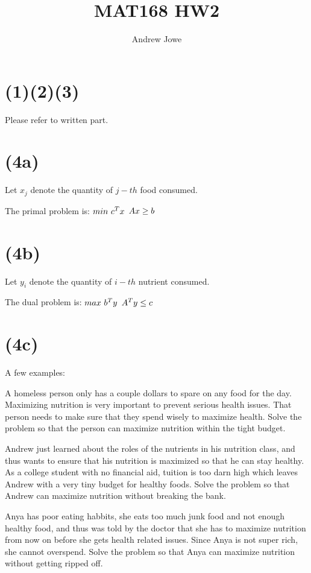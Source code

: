 \documentclass[17pt]{extarticle}
\title{MAT168 HW2}
\author{Andrew Jowe}
\begin{document}
\maketitle
\section*{(1)(2)(3)}
Please refer to written part.

\section*{(4a)}
Let $x_j$ denote the quantity of $j-th$ food consumed.

\bigskip The primal problem is:
$\\min \ c^Tx$
$\\Ax \geq b$

\section*{(4b)}
Let $y_i$ denote the quantity of $i-th$ nutrient consumed.

The dual problem is:
$\\max \ b^Ty$
$\\A^Ty \leq c$

\section*{(4c)}
A few examples:

\bigskip A homeless person only has a couple dollars to spare on any food for the day. Maximizing nutrition is very important to prevent serious health issues. That person needs to make sure that they spend wisely to maximize health. Solve the problem so that the person can maximize nutrition within the tight budget.

\bigskip Andrew just learned about the roles of the nutrients in his nutrition class, and thus wants to ensure that his nutrition is maximized so that he can stay healthy. As a college student with no financial aid, tuition is too darn high which leaves Andrew with a very tiny budget for healthy foods. Solve the problem so that Andrew can maximize nutrition without breaking the bank.

\bigskip Anya has poor eating habbits, she eats too much junk food and not enough healthy food, and thus was told by the doctor that she has to maximize nutrition from now on before she gets health related issues. Since Anya is not super rich, she cannot overspend. Solve the problem so that Anya can maximize nutrition without getting ripped off.
\end{document}
